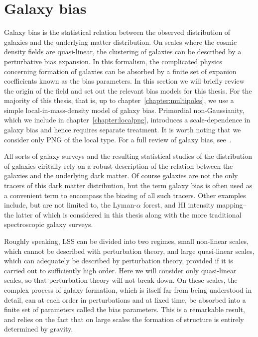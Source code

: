 \section{Galaxy bias}
\label{section:galaxybias}

Galaxy bias is the statistical relation between the observed distribution of galaxies and the underlying matter distribution. On scales where the cosmic density fields are quasi-linear, the clustering of galaxies can be described by a perturbative bias expansion. In this formalism, the complicated physics concerning formation of galaxies can be absorbed by a finite set of expanion coefficients known as the bias parameters. In this section we will briefly review the origin of the field and set out the relevant bias models for this thesis. For the majority of this thesis, that is, up to chapter~\ref{chapter:multipoles}, we use a simple local-in-mass-density model of galaxy bias. Primordial non-Gaussianity, which we include in chapter~\ref{chapter:localpng}, introduces a scale-dependence in galaxy bias and hence requires separate treatment. It is worth noting that we consider only PNG of the local type. For a full review of galaxy bias, see~\cite{Desjacques:2016bnm}.

All sorts of galaxy surveys and the resulting statistical studies of the distribution of galaxies ciritally rely on a robust description of the relation between the galaxies and the underlying dark matter. Of course galaxies are not the only tracers of this dark matter distribution, but the term galaxy bias is often used as a convenient term to encompass the biasing of all such tracers. Other examples include, but are not limited to, the Lyman-$\alpha$ forest, and HI intensity mapping-- the latter of which is considered in this thesis along with the more traditional spectroscopic galaxy surveys. 

Roughly speaking, LSS can be divided into two regimes, small non-linear scales, which cannot be described with perturbation theory, and large quasi-linear scales, which can adequately be described by perturbation theory, provided if it is carried out to sufficiently high order. Here we will consider only quasi-linear scales, so that perturbation theory will not break down. On these scales, the complex process of galaxy formation, which is itself far from being understood in detail, can at each order in perturbations and at fixed time, be absorbed into a finite set of parameters called the bias parameters. This is a remarkable result, and relies on the fact that on large scales the formation of structure is entirely determined by gravity. 

